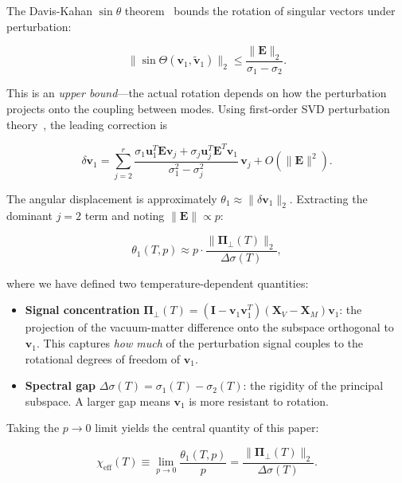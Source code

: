 \documentclass[aps,prl,twocolumn,superscriptaddress,byrevtex]{article}
\begin{document}
The Davis-Kahan $\sin\theta$ theorem~\cite{davis1970} bounds the rotation of singular vectors under perturbation:

\begin{equation}
\|\sin\Theta(\mathbf{v}_1, \tilde{\mathbf{v}}_1)\|_2 \leq \frac{\|\mathbf{E}\|_2}{\sigma_1 - \sigma_2}.
\label{eq:dk_bound}
\end{equation}

This is an \emph{upper bound}---the actual rotation depends on how the perturbation projects onto the coupling between modes. Using first-order SVD perturbation theory~\cite{stewart1990}, the leading correction is

\begin{equation}
\delta\mathbf{v}_1 = \sum_{j=2}^{r} \frac{\sigma_1 \mathbf{u}_1^T \mathbf{E} \mathbf{v}_j + \sigma_j \mathbf{u}_j^T \mathbf{E}^T \mathbf{v}_1}{\sigma_1^2 - \sigma_j^2}\,\mathbf{v}_j + O(\|\mathbf{E}\|^2).
\label{eq:first_order}
\end{equation}

The angular displacement is approximately $\theta_1 \approx \|\delta\mathbf{v}_1\|_2$. Extracting the dominant $j=2$ term and noting $\|\mathbf{E}\| \propto p$:

\begin{equation}
\theta_1(T, p) \approx p \cdot \frac{\|\boldsymbol{\Pi}_\perp(T)\|_2}{\Delta\sigma(T)},
\label{eq:theta_approx}
\end{equation}

where we have defined two temperature-dependent quantities:

\begin{itemize}
\item \textbf{Signal concentration} $\boldsymbol{\Pi}_\perp(T) = (\mathbf{I} - \mathbf{v}_1\mathbf{v}_1^T)(\mathbf{X}_V - \mathbf{X}_M)\mathbf{v}_1$: the projection of the vacuum-matter difference onto the subspace orthogonal to $\mathbf{v}_1$. This captures \emph{how much} of the perturbation signal couples to the rotational degrees of freedom of $\mathbf{v}_1$.
\item \textbf{Spectral gap} $\Delta\sigma(T) = \sigma_1(T) - \sigma_2(T)$: the rigidity of the principal subspace. A larger gap means $\mathbf{v}_1$ is more resistant to rotation.
\end{itemize}

Taking the $p \to 0$ limit yields the central quantity of this paper:

\begin{equation}
\boxed{\chi_{\text{eff}}(T) \equiv \lim_{p \to 0} \frac{\theta_1(T, p)}{p} = \frac{\|\boldsymbol{\Pi}_\perp(T)\|_2}{\Delta\sigma(T)}.}
\label{eq:chi_eff_product}
\end{equation}
\end{document}
